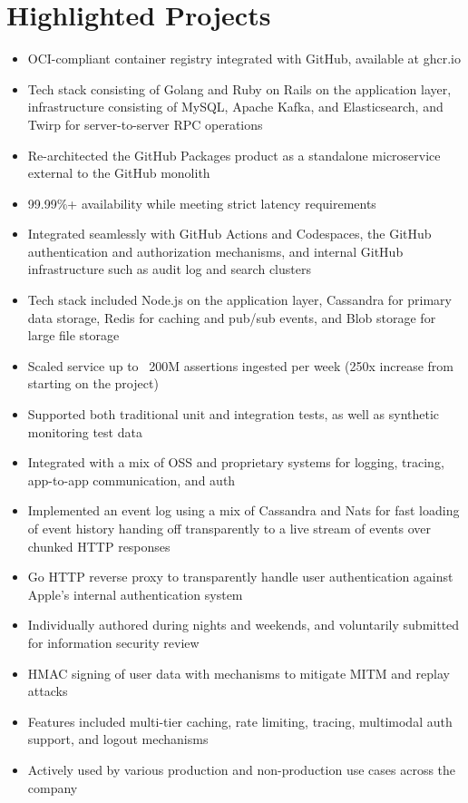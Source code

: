 \documentclass[11pt,letterpaper,sans]{moderncv}        %
\begin{document}
\newpage

\section{Highlighted Projects}

\begin{itemize}
\item OCI-compliant container registry integrated with GitHub, available at ghcr.io
\item Tech stack consisting of Golang and Ruby on Rails on the application layer, infrastructure consisting of MySQL, Apache Kafka, and Elasticsearch, and Twirp for server-to-server RPC operations
\item Re-architected the GitHub Packages product as a standalone microservice external to the GitHub monolith
\item 99.99\%+ availability while meeting strict latency requirements
\item Integrated seamlessly with GitHub Actions and Codespaces, the GitHub authentication and authorization mechanisms, and internal GitHub infrastructure such as  audit log and search clusters
\end{itemize}

\begin{itemize}
\item Tech stack included Node.js on the application layer, Cassandra for primary data storage, Redis for caching and pub/sub events, and Blob storage for large file storage
\item Scaled service up to ~200M assertions ingested per week (250x increase from starting on the project)
\item Supported both traditional unit and integration tests, as well as synthetic monitoring test data
\item Integrated with a mix of OSS and proprietary systems for logging, tracing, app-to-app communication, and auth
\item Implemented an event log using a mix of Cassandra and Nats for fast loading of event history handing off transparently to a live stream of events over chunked HTTP responses
\end{itemize}

\begin{itemize}
\item Go HTTP reverse proxy to transparently handle user authentication against Apple's internal authentication system
\item Individually authored during nights and weekends, and voluntarily submitted for information security review
\item HMAC signing of user data with mechanisms to mitigate MITM and replay attacks
\item Features included multi-tier caching, rate limiting, tracing, multimodal auth support, and logout mechanisms
\item Actively used by various production and non-production use cases across the company
\end{itemize}
\end{document}
